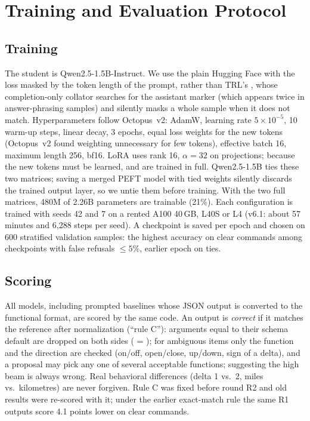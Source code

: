 \section{Training and Evaluation Protocol}
\label{sec:protocol}

\subsection{Training}
\label{sec:training}

The student is Qwen2.5-1.5B-Instruct. We use the plain Hugging Face  with the loss masked by the token length of
the prompt, rather than TRL's , whose completion-only collator searches for the assistant marker (which
appears twice in answer-phrasing samples) and silently masks a whole sample when it does not match. Hyperparameters follow
Octopus~v2: AdamW, learning rate $5\times10^{-5}$, 10 warm-up steps, linear decay, 3 epochs, equal loss weights for the new
tokens (Octopus~v2 found weighting unnecessary for few tokens), effective batch 16, maximum length 256, bf16. LoRA uses rank 16,
$\alpha=32$ on  projections; because the new tokens must be learned,  and
 are trained in full. Qwen2.5-1.5B ties these two matrices; saving a merged PEFT model with tied weights
silently discards the trained output layer, so we untie them before training. With the two full matrices, 480M of 2.26B
parameters are trainable (21\%). Each configuration is trained with seeds 42 and 7 on a rented A100 40\,GB, L40S or L4
(v6.1: about 57 minutes and 6,288 steps per seed). A checkpoint is saved per epoch and chosen on 600 stratified validation
samples: the highest accuracy on clear commands among checkpoints with false refusals $\le5\%$, earlier epoch on ties.

\subsection{Scoring}
\label{sec:scoring}

All models, including prompted baselines whose JSON output is converted to the functional format, are scored by the same
code. An output is \emph{correct} if it matches the reference after normalization (``rule C''): arguments equal to their
schema default are dropped on both sides ( = ); for ambiguous items only
the function and the direction are checked (on/off, open/close, up/down, sign of a delta), and a proposal may pick any one of
several acceptable functions; suggesting the high beam is always wrong. Real behavioral differences (delta 1 vs.\ 2, miles vs.\
kilometres) are never forgiven. Rule C was fixed before round R2 and old results were re-scored with it; under the earlier
exact-match rule the same R1 outputs score 4.1 points lower on clear commands.

